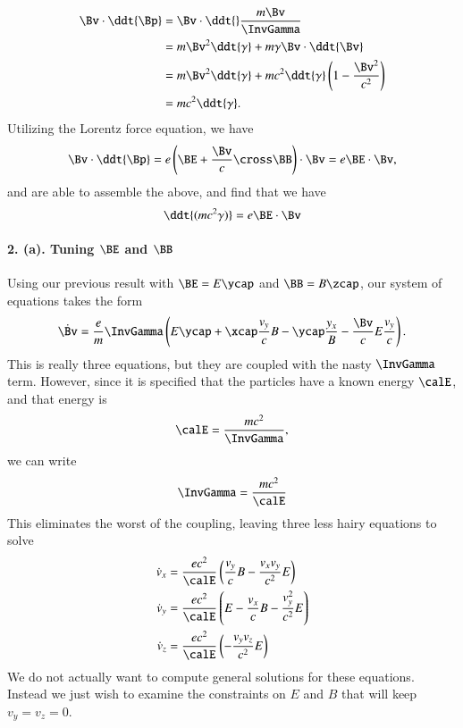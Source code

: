 {\begin{equation}
\begin{aligned}
\Bv \cdot \ddt{\Bp}
&= \Bv \cdot \ddt{} \frac{m \Bv}{\InvGamma} \\
&= m\Bv^2 \ddt{\gamma} + m \gamma \Bv \cdot \ddt{\Bv} \\
&= m\Bv^2 \ddt{\gamma} + m c^2 \ddt{\gamma} \left( 1 - \frac{\Bv^2}{c^2} \right) \\
&= m c^2 \ddt{\gamma}.
\end{aligned}
\end{equation}
%
Utilizing the Lorentz force equation, we have
%
\begin{equation}\label{eqn:relElectroDynProblemSet2:250}
\Bv \cdot \ddt{\Bp} = e \left( \BE + \frac{\Bv}{c} \cross \BB \right) \cdot \Bv = e \BE \cdot \Bv,
\end{equation}
and are able to assemble the above, and find that we have
\begin{equation}\label{eqn:relElectroDynProblemSet2:270}
\ddt{(m c^2 \gamma)} = e \BE \cdot \Bv
\end{equation}
\paragraph{2. (a). Tuning \texorpdfstring{\(\BE\) and \(\BB\)}{E and B}}
Using our previous result with \(\BE = E \ycap\) and \(\BB = B \zcap\), our system of equations takes the form
%
\begin{equation}\label{eqn:relElectroDynProblemSet2:290}
\dot{\Bv} = \frac{e}{m} \InvGamma \left( E \ycap + \xcap \frac{v_y}{c} B - \ycap \frac{y_x} B - \frac{\Bv}{c} E \frac{v_y}{c} \right).
\end{equation}
This is really three equations, but they are coupled with the nasty \(\InvGamma\) term.  However, since it is specified that the particles have a known energy \(\calE\), and that energy is
%
\begin{equation}\label{eqn:relElectroDynProblemSet2:310}
\calE = \frac{ m c^2 }{\InvGamma},
\end{equation}
we can write
%
\begin{equation}\label{eqn:relElectroDynProblemSet2:330}
\InvGamma = \frac{ m c^2 }{\calE}
\end{equation}
%
This eliminates the worst of the coupling, leaving three less hairy equations to solve
%
\begin{equation}\label{eqn:relElectroDynProblemSet2:350}
\begin{aligned}
\dot{v}_x &= \frac{e c^2}{\calE} \left( \frac{v_y}{c} B - \frac{v_x v_y}{c^2} E \right) \\
\dot{v}_y &= \frac{e c^2}{\calE} \left( E - \frac{v_x}{c} B - \frac{v_y^2}{c^2} E \right) \\
\dot{v}_z &= \frac{e c^2}{\calE} \left( - \frac{v_y v_z}{c^2} E \right)
\end{aligned}
\end{equation}
%
We do not actually want to compute general solutions for these equations.  Instead we just wish to examine the constraints on \(E\) and \(B\) that will keep \(v_y = v_z = 0\).

}

